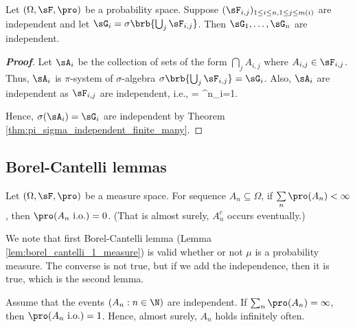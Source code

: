 \begin{theorem}\label{thm:pi_sigma_independent_finite_many_ij}
Let $(\Omega,\sF,\pro)$ be a probability space. Suppose $(\sF_{i,j})_{1\leq i \leq n, 1 \leq j \leq m(i)}$ are independent %
and let $\sG_i = \sigma\brb{\bigcup_j \sF_{i,j}}$. Then $\sG_1, \dots, \sG_n$ are independent.
\end{theorem}

\begin{proof}[\bf Proof]
Let $\sA_i$ be the collection of sets of the form $\bigcap_jA_{i,j}$ where $A_{i,j} \in \sF_{i,j}$. Thus, $\sA_i$ is $\pi$-system of $\sigma$-algebra $\sigma\brb{\bigcup_j \sF_{i,j}} = \sG_i$. Also, $\sA_i$ are independent as $\sF_{i,j}$ are independent, i.e.,
\be
\pro{} = \prod^n_{i=1}\pro{}.
\ee

Hence, $\sigma(\sA_i) =\sG_i$ are independent by Theorem \ref{thm:pi_sigma_independent_finite_many}.
\end{proof}


\subsection{Borel-Cantelli lemmas}


\begin{lemma}\label{lem:borel_cantelli_1_probability}
Let $(\Omega,\sF,\pro)$ be a measure space. For sequence $A_n \subseteq \Omega$, if $\sum\limits_n \pro(A_n) < \infty$, then $\pro(A_n\text{ i.o.}) = 0$. (That is almost surely, $A_n^c$ occurs eventually.)
\end{lemma}

We note that first Borel-Cantelli lemma (Lemma \ref{lem:borel_cantelli_1_measure}) is valid whether or not $\mu$ is a probability measure. The converse is not true, but if we add the independence, then it is true, which is the second lemma.

\begin{lemma}\label{lem:borel_cantelli_2}
Assume that the events $(A_n:n\in\N)$ are independent. If $\sum_n \pro(A_n)=\infty$, then $\pro(A_n \text{ i.o.})=1$. Hence, almost surely, $A_n$ holds infinitely often.
\end{lemma}

